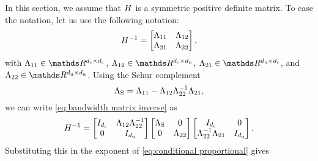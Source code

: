 In this section, we assume that $H$ is a symmetric positive definite matrix. 
To ease the notation, let us use the following notation:
\begin{equation}
	\label{eq:bandwidth matrix inverse}
	H^{-1} = 
	\begin{bmatrix}
		\Lambda_{11} & \Lambda_{12} \\ \Lambda_{21} & \Lambda_{22}
	\end{bmatrix},
\end{equation}
with $\bwiul \in \realnumbers^{\dimensionparta \times \dimensionparta}$, $\bwiur \in \realnumbers^{\dimensionparta \times \dimensionpartb}$, $\bwibl \in \realnumbers^{\dimensionpartb \times \dimensionparta}$, and $\bwibr \in \realnumbers^{\dimensionpartb \times \dimensionpartb}$.
Using the Schur complement \autocite{zhang2006schur} 
\begin{equation}
	\label{eq:schur complement}
	\Lambda_{\mathrm{S}}=\Lambda_{11} - \Lambda_{12} \Lambda_{22}^{-1} \Lambda_{21},
\end{equation}
we can write \cref{eq:bandwidth matrix inverse} as
\begin{equation*}
	H^{-1}
	= \begin{bmatrix} I_{d_\mathrm{c}} & \Lambda_{12} \Lambda_{22}^{-1} \\ 0 & I_{d_\mathrm{u}} \end{bmatrix}
	\begin{bmatrix} \Lambda_{\mathrm{S}}  & 0 \\ 0 & \Lambda_{22} \end{bmatrix}
	\begin{bmatrix} I_{d_\mathrm{c}}  & 0 \\ \Lambda_{22}^{-1} \Lambda_{21} & I_{d_\mathrm{u}} \end{bmatrix}.
\end{equation*}
Substituting this in the exponent of \cref{eq:conditional proportional} gives
